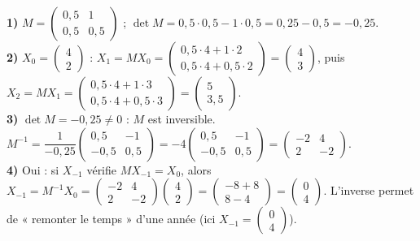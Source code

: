\textbf{1)} $M=\begin{pmatrix}0{,}5&1\\0{,}5&0{,}5\end{pmatrix}$ ;
$\det M=0{,}5\cdot0{,}5-1\cdot0{,}5=0{,}25-0{,}5=-0{,}25$.\\
\textbf{2)} $X_0=\begin{pmatrix}4\\2\end{pmatrix}$ :
$X_1=MX_0=\begin{pmatrix}0{,}5\cdot4+1\cdot2\\0{,}5\cdot4+0{,}5\cdot2\end{pmatrix}
=\begin{pmatrix}4\\3\end{pmatrix}$, puis
$X_2=MX_1=\begin{pmatrix}0{,}5\cdot4+1\cdot3\\0{,}5\cdot4+0{,}5\cdot3\end{pmatrix}
=\begin{pmatrix}5\\3{,}5\end{pmatrix}$.\\
\textbf{3)} $\det M=-0{,}25\neq0$ : $M$ est inversible.
$M^{-1}=\dfrac1{-0{,}25}\begin{pmatrix}0{,}5&-1\\-0{,}5&0{,}5\end{pmatrix}
=-4\begin{pmatrix}0{,}5&-1\\-0{,}5&0{,}5\end{pmatrix}=\begin{pmatrix}-2&4\\2&-2\end{pmatrix}$.\\
\textbf{4)} Oui : si $X_{-1}$ vérifie $MX_{-1}=X_0$, alors $X_{-1}=M^{-1}X_0
=\begin{pmatrix}-2&4\\2&-2\end{pmatrix}\begin{pmatrix}4\\2\end{pmatrix}
=\begin{pmatrix}-8+8\\8-4\end{pmatrix}=\begin{pmatrix}0\\4\end{pmatrix}$. L'inverse permet de
« remonter le temps » d'une année (ici $X_{-1}=\begin{pmatrix}0\\4\end{pmatrix}$).


